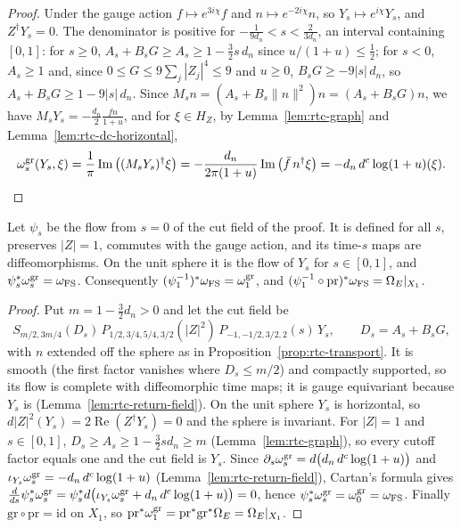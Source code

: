 \begin{proof}
Under the gauge action $f\mapsto e^{3i\chi}f$ and $n\mapsto e^{-2i\chi}n$, so $Y_s\mapsto e^{i\chi}Y_s$, and $Z^\dagger Y_s=0$. The
denominator is positive for $-\frac1{9d_n}<s<\frac2{3d_n}$, an interval containing $[0,1]$: for $s\ge0$,
$A_s+B_sG\ge A_s\ge1-\frac32s\,d_n$ since $u/(1+u)\le\frac12$; for $s<0$, $A_s\ge1$ and, since
$0\le G\le9\sum_j|Z_j|^4\le9$ and $u\ge0$, $B_sG\ge-9|s|\,d_n$, so $A_s+B_sG\ge1-9|s|\,d_n$. Since
$M_sn=(A_s+B_s\|n\|^2)n=(A_s+B_sG)n$, we have $M_sY_s=-\frac{d_n}2\frac{fn}{1+u}$, and for $\xi\in H_Z$, by Lemma~\ref{lem:rtc-graph}
and Lemma~\ref{lem:rtc-dc-horizontal},
\[
 \omega^{\rm gr}_s(Y_s,\xi)=\frac1\pi\operatorname{Im}\big((M_sY_s)^\dagger\xi\big)
 =-\frac{d_n}{2\pi(1+u)}\operatorname{Im}\big(\bar f\,n^\dagger\xi\big)=-d_n\,d^c\log(1+u)(\xi).\qedhere
\]
\end{proof}

\begin{proposition}\label{prop:rtc-return}
Let $\psi_s$ be the flow from $s=0$ of the cut field of the proof. It is defined for all $s$, preserves $|Z|=1$, commutes
with the gauge action, and its time-$s$ maps are diffeomorphisms. On the unit sphere it is the flow of $Y_s$ for
$s\in[0,1]$, and $\psi_s^*\omega_s^{\rm gr}=\omega_{\rm FS}$. Consequently $(\psi_1^{-1})^*\omega_{\rm FS}=\omega^{\rm gr}_1$, and
$(\psi_1^{-1}\circ\mathrm{pr})^*\omega_{\rm FS}=\Omega_E|_{X_1}$.
\end{proposition}
\begin{proof}
Put $m=1-\frac32d_n>0$ and let the cut field be
\[
 S_{m/2,3m/4}(D_s)\,P_{1/2,3/4,5/4,3/2}(|Z|^2)\,P_{-1,-1/2,3/2,2}(s)\,Y_s,\qquad D_s=A_s+B_sG,
\]
with $n$ extended off the sphere as in Proposition~\ref{prop:rtc-transport}. It is smooth (the first factor vanishes where
$D_s\le m/2$) and compactly supported, so its flow is complete with diffeomorphic time maps; it is gauge equivariant because $Y_s$
is (Lemma~\ref{lem:rtc-return-field}). On the unit sphere $Y_s$ is horizontal, so $d|Z|^2(Y_s)=2\operatorname{Re}(Z^\dagger Y_s)=0$ and the
sphere is invariant. For $|Z|=1$ and $s\in[0,1]$, $D_s\ge A_s\ge1-\frac32sd_n\ge m$ (Lemma~\ref{lem:rtc-graph}), so every cutoff
factor equals one and the cut field is $Y_s$. Since $\partial_s\omega^{\rm gr}_s=d\bigl(d_n\,d^c\log(1+u)\bigr)$ and
$\iota_{Y_s}\omega^{\rm gr}_s=-d_n\,d^c\log(1+u)$ (Lemma~\ref{lem:rtc-return-field}), Cartan's formula gives
$\frac d{ds}\psi_s^*\omega^{\rm gr}_s=\psi_s^*d\bigl(\iota_{Y_s}\omega^{\rm gr}_s+d_n\,d^c\log(1+u)\bigr)=0$, hence
$\psi_s^*\omega^{\rm gr}_s=\omega^{\rm gr}_0=\omega_{\rm FS}$. Finally $\mathrm{gr}\circ\mathrm{pr}=\mathrm{id}$ on $X_1$, so
$\mathrm{pr}^*\omega^{\rm gr}_1=\mathrm{pr}^*\mathrm{gr}^*\Omega_E=\Omega_E|_{X_1}$.
\end{proof}

